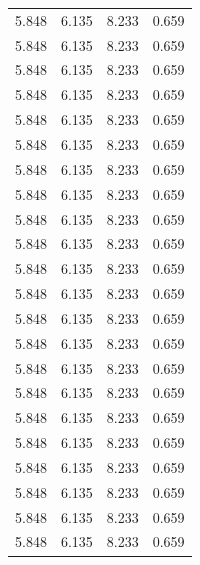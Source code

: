 \begin{longtable}{c|c|c|c}
	5.848 & 6.135 & 8.233 & 0.659 \\
	5.848 & 6.135 & 8.233 & 0.659 \\
	5.848 & 6.135 & 8.233 & 0.659 \\
	5.848 & 6.135 & 8.233 & 0.659 \\
	5.848 & 6.135 & 8.233 & 0.659 \\
	5.848 & 6.135 & 8.233 & 0.659 \\
	5.848 & 6.135 & 8.233 & 0.659 \\
	5.848 & 6.135 & 8.233 & 0.659 \\
	5.848 & 6.135 & 8.233 & 0.659 \\
	5.848 & 6.135 & 8.233 & 0.659 \\
	5.848 & 6.135 & 8.233 & 0.659 \\
	5.848 & 6.135 & 8.233 & 0.659 \\
	5.848 & 6.135 & 8.233 & 0.659 \\
	5.848 & 6.135 & 8.233 & 0.659 \\
	5.848 & 6.135 & 8.233 & 0.659 \\
	5.848 & 6.135 & 8.233 & 0.659 \\
	5.848 & 6.135 & 8.233 & 0.659 \\
	5.848 & 6.135 & 8.233 & 0.659 \\
	5.848 & 6.135 & 8.233 & 0.659 \\
	5.848 & 6.135 & 8.233 & 0.659 \\
	5.848 & 6.135 & 8.233 & 0.659 \\
	5.848 & 6.135 & 8.233 & 0.659 \\
\end{longtable}